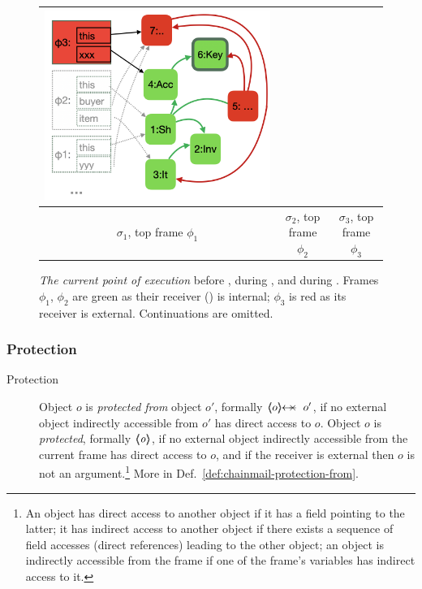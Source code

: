 \begin{figure}[th]
\begin{tabular}{|c|c|c|}
{\includegraphics[width=\linewidth]{diagrams/ShopD.png}
}
\\
\hline
$\sigma_1$, top frame $\phi_1$  %
&
$\sigma_2$, top frame $\phi_2$ 
&
$\sigma_3$, top frame $\phi_3$ 
\\
\hline %
\end{tabular}
\caption{\textit{The current point of execution} before , during , and during .  Frames $\phi_1$, $\phi_2$ are green  as their receiver () is internal;  $\phi_3$ is red as its receiver is external. Continuations are omitted.}
 \label{f:CurrentPoint}
 \end{figure}


\subsubsection{Protection}
\label{sect:approach:protection}


 \begin{description}
\item[Protection] 
Object $o$ is \emph{protected  from} object $o'$, formally $\protectedFrom {o} {o'}$,  
if no external object indirectly accessible from $o'$ has direct access to $o$.
Object $o$ is \emph{protected}, formally ${\langle\!\!\langle \mbox{\normalfont{\texttt{\it{o}}}} \rangle\!\!\rangle}$,  
if no external object indirectly accessible from the current frame has direct access to $o$,
 and  if the receiver is external then $o$ is not an argument.\footnote{An object has direct access to another object if it has a field pointing to the latter;
 it has indirect access to another object if there exists a sequence of field accesses (direct references) leading to the other object; 
 an object is indirectly accessible from the frame if one of the frame's variables has indirect access to it.} 
 More in Def.\ \ref{def:chainmail-protection-from}. %
\end{description}
 
